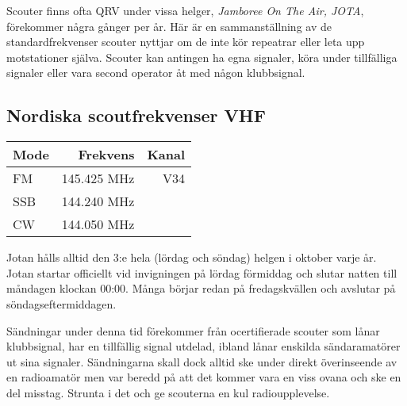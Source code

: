 Scouter finns ofta QRV under vissa helger, \textit{Jamboree On The Air, JOTA}, förekommer några gånger per år. Här är en sammanställning av de standardfrekvenser scouter nyttjar om de inte kör repeatrar eller leta upp motstationer själva. Scouter kan antingen ha egna signaler, köra under
tillfälliga signaler eller vara second operator åt med någon klubbsignal.

\subsection{Nordiska scoutfrekvenser VHF}

\begin{center}
\begin{tabular}{lrr}
	\textbf{Mode} & \textbf{Frekvens} & \textbf{Kanal} \\ \hline
	FM            &      145.425  MHz &   V34 \\
	SSB           &      144.240  MHz &  \\
	CW            &      144.050  MHz &
\end{tabular}
\end{center}

Jotan hålls alltid den 3:e hela (lördag och söndag) helgen i oktober varje år. Jotan startar officiellt vid invigningen på lördag förmiddag och slutar natten till måndagen klockan 00:00. Många börjar redan på fredagskvällen och avslutar på söndagseftermiddagen.

Sändningar under denna tid förekommer från ocertifierade scouter som lånar klubbsignal, har en tillfällig signal utdelad, ibland lånar enskilda sändaramatörer ut sina signaler. Sändningarna skall dock alltid ske under direkt överinseende av en radioamatör men var beredd på att det kommer vara en viss ovana och ske en del misstag. Strunta i det och ge scouterna en kul radioupplevelse.








